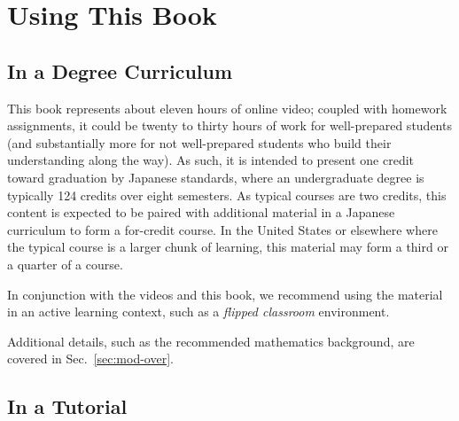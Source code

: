 \chapter*{Using This Book}

\section*{In a Degree Curriculum}

This book represents about eleven hours of online video; coupled with homework assignments, it could be twenty to thirty hours of work for well-prepared students (and substantially more for not well-prepared students who build their understanding along the way).  As such, it is intended to present one credit toward graduation by Japanese standards, where an undergraduate degree is typically 124 credits over eight semesters. As typical courses are two credits, this content is expected to be paired with additional material in a Japanese curriculum to form a for-credit course. In the United States or elsewhere where the typical course is a larger chunk of learning, this material may form a third or a quarter of a course.

In conjunction with the videos and this book, we recommend using the material in an active learning context, such as a \emph{flipped classroom} environment.

Additional details, such as the recommended mathematics background, are covered in Sec.~\ref{sec:mod-over}.

\section*{In a Tutorial}

